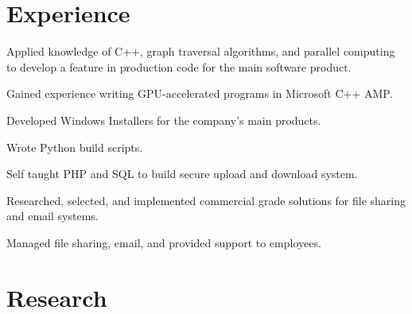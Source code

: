 \documentclass[letterpaper]{deedy-resume} %
\begin{document}
\begin{minipage}[t]{0.66\textwidth} %


\section{Experience}


\vspace{\topsep} %
\begin{tightitemize}
\item Applied knowledge of C++, graph traversal algorithms, and parallel
  computing to develop a feature in production code for the main software
  product.
\item Gained experience writing GPU-accelerated programs in Microsoft C++ AMP.
\item Developed Windows Installers for the company's main products.
\item Wrote Python build scripts.
\end{tightitemize}

\sectionspace %



\begin{tightitemize}
\item Self taught PHP and SQL to build secure upload and download system.
\item Researched, selected, and implemented commercial grade solutions
  for file sharing and email systems.
\item Managed file sharing, email, and provided support to employees.
\end{tightitemize}

\sectionspace %


\section{Research}


\end{minipage}
\end{document}
